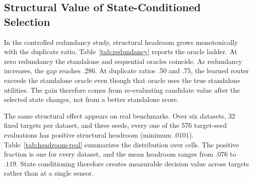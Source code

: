 \subsection{Structural Value of State-Conditioned Selection}

In the controlled redundancy study, structural headroom grows monotonically
with the duplicate ratio. Table~\ref{tab:redundancy} reports the oracle ladder.
At zero redundancy the standalone and sequential oracles coincide. As
redundancy increases, the gap reaches .286. At duplicate ratios .50 and .75,
the learned router exceeds the standalone oracle even though that oracle uses
the true standalone utilities. The gain therefore comes from re-evaluating
candidate value after the selected state changes, not from a better standalone
score.

\begin{table}[t]
\centering
\small
\caption{Controlled redundancy study at $K=16$ and budget four. Gains are
loss reductions relative to the anchor-only predictor; results are averaged
over five seeds.}
\label{tab:redundancy}
\end{table}

The same structural effect appears on real benchmarks. Over six datasets, 32
fixed targets per dataset, and three seeds, every one of the 576 target-seed
evaluations has positive structural headroom (minimum $.0101$).
Table~\ref{tab:headroom-real} summarizes the distribution over cells. The
positive fraction is one for every dataset, and the mean headroom ranges from
$.076$ to $.119$. State conditioning therefore creates measurable decision value
across targets rather than at a single sensor.

